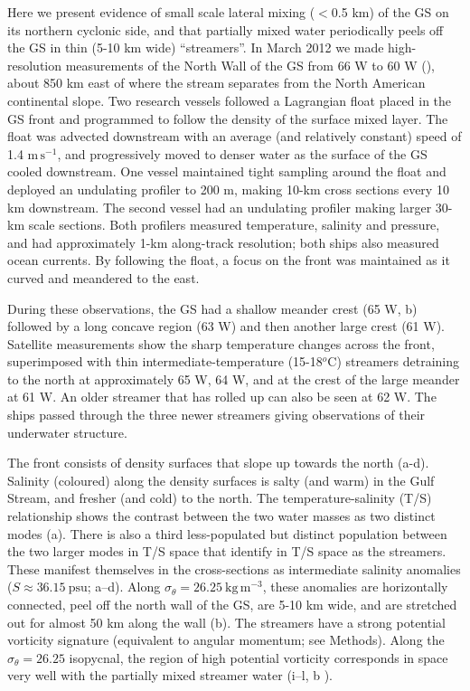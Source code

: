 \documentclass{natureJMK}
\begin{document}
Here we present evidence of small scale lateral mixing ($<$0.5 km)  of the GS on its northern cyclonic side, and that  partially mixed water periodically peels off the GS in thin (5-10 km wide) ``streamers''.  In March 2012 we made high-resolution measurements of the North Wall of the GS from 66 W to 60 W (), about 850 km east of where the stream separates from the North American continental slope.  Two research vessels followed a Lagrangian float placed in the GS front and programmed to follow the density of the surface mixed layer. The float was advected downstream with an average (and relatively constant) speed of 1.4 $\mathrm{m\,s^{-1}}$, and progressively moved to denser water as the surface of the GS cooled downstream.  One vessel maintained tight sampling around the float and deployed an undulating profiler to 200 m, making 10-km cross sections every 10 km downstream.  The second vessel  had an undulating profiler making larger 30-km  scale sections.  Both profilers measured temperature, salinity and pressure, and had approximately 1-km along-track resolution; both ships also measured ocean currents.  By following the float, a focus on the front was maintained as it curved and meandered to the east.  

During these observations, the GS had a shallow meander crest (65 W, b)  followed by a long concave region (63 W) and then another large  crest (61 W).  Satellite measurements show the sharp temperature changes across the front, superimposed with thin intermediate-temperature (15-18$^o$C) streamers detraining to the north at approximately 65 W, 64 W, and at the crest of the large meander at 61 W.  An older streamer that has rolled up can also be seen at 62 W.  The ships passed through the three newer streamers giving observations of their underwater structure.  

The front consists of density surfaces that slope up towards the north (a-d).  Salinity (coloured) along the density surfaces is salty (and warm) in the Gulf Stream, and fresher (and cold) to the north.  The temperature-salinity (T/S) relationship shows the contrast between the two water masses as two distinct modes (a).  There is also a third less-populated but distinct population between the two larger modes in T/S space that identify in T/S space as the streamers.  These manifest themselves in the cross-sections as intermediate salinity anomalies ($S \approx 36.15\ \mathrm{psu}$; a--d).  Along $\sigma_{\theta}=26.25\ \mathrm{kg\,m^{-3}}$, these anomalies are horizontally connected, peel off the north wall of the GS, are 5-10 km wide, and are stretched out for almost 50 km along the wall (b). The streamers have a strong potential vorticity signature (equivalent to angular momentum; see Methods).  Along the $\sigma_{\theta} = 26.25$ isopycnal, the region of high potential vorticity corresponds in space very well with the partially mixed streamer water (i--l, b ).   
\end{document}
